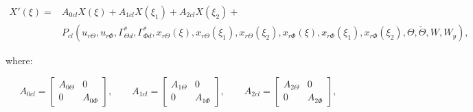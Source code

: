 \documentclass[../main.tex]{subfiles}
\begin{document}
\begin{align}
	X'(\xi) =&	A_{0cl}X(\xi) + A_{1cl}X(\xi_1) + A_{2cl} X(\xi_2) + \nonumber\\ &P_{cl}(u_{r\Theta},u_{r\Phi},\Gamma_{\Theta d}^*,\Gamma_{\Phi d}^*,x_{r\Theta}(\xi),x_{r\Theta}(\xi_1), x_{r\Theta}(\xi_2),x_{r\Phi}(\xi),x_{r\Phi}(\xi_1),x_{r\Phi}(\xi_2), \Theta,\check{\Theta},W,W_y),
	\label{eq:totaldynamicsrobust}
\end{align}	

where:

\begin{equation}
A_{0cl} = 
\begin{bmatrix}
A_{0\Theta} & 0 \\
0 & A_{0\Phi}
\end{bmatrix}, \qquad
A_{1cl} =
\begin{bmatrix}
A_{1\Theta} & 0 \\
0 & A_{1\Phi}
\end{bmatrix}, \qquad
A_{2cl} =
\begin{bmatrix}
A_{2\Theta} & 0 \\
0 & A_{2\Phi}
\end{bmatrix},
\label{eq:ClosedLoopMatricesRobust}
\end{equation}
\end{document}
